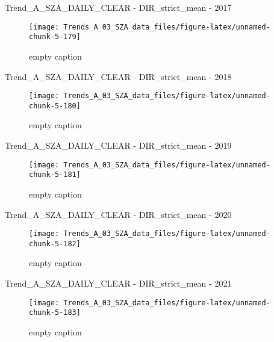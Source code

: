 \documentclass[
  10pt,
  a4paper,oneside]{article}
\begin{document}
Trend\_A\_SZA\_DAILY\_CLEAR - DIR\_strict\_mean - 2017

\begin{figure}[!ht]

{\centering \texttt{[image: Trends\_A\_03\_SZA\_data\_files/figure-latex/unnamed-chunk-5-179]} 

}

\caption{ empty caption }\label{fig:unnamed-chunk-5-179}
\end{figure}

Trend\_A\_SZA\_DAILY\_CLEAR - DIR\_strict\_mean - 2018

\begin{figure}[!ht]

{\centering \texttt{[image: Trends\_A\_03\_SZA\_data\_files/figure-latex/unnamed-chunk-5-180]} 

}

\caption{ empty caption }\label{fig:unnamed-chunk-5-180}
\end{figure}

Trend\_A\_SZA\_DAILY\_CLEAR - DIR\_strict\_mean - 2019

\begin{figure}[!ht]

{\centering \texttt{[image: Trends\_A\_03\_SZA\_data\_files/figure-latex/unnamed-chunk-5-181]} 

}

\caption{ empty caption }\label{fig:unnamed-chunk-5-181}
\end{figure}

Trend\_A\_SZA\_DAILY\_CLEAR - DIR\_strict\_mean - 2020

\begin{figure}[!ht]

{\centering \texttt{[image: Trends\_A\_03\_SZA\_data\_files/figure-latex/unnamed-chunk-5-182]} 

}

\caption{ empty caption }\label{fig:unnamed-chunk-5-182}
\end{figure}

Trend\_A\_SZA\_DAILY\_CLEAR - DIR\_strict\_mean - 2021

\begin{figure}[!ht]

{\centering \texttt{[image: Trends\_A\_03\_SZA\_data\_files/figure-latex/unnamed-chunk-5-183]} 

}

\caption{ empty caption }\label{fig:unnamed-chunk-5-183}
\end{figure}
\end{document}
